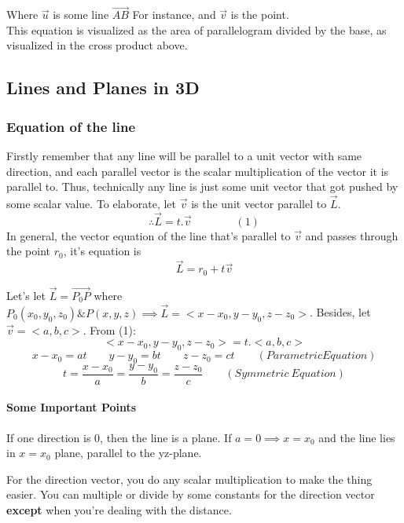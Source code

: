\documentclass{article}
\begin{document}
	Where $\vec{ u }$ is some line $ \vec{ AB } $ For instance, and $\vec{ v }$ is the point. \\ 
	This equation is visualized as the area of parallelogram divided by the base, as visualized in the cross product above.
	\\
	\newpage
	\subsection{Lines and Planes in 3D}

	\subsubsection{Equation of the line}

	Firstly remember that any line will be parallel to a unit vector with same direction, and each parallel vector is the scalar multiplication of the vector it is parallel to. Thus, technically any line is just some unit vector that got pushed by some scalar value. To elaborate, let $ \vec{ v } $ is the unit vector parallel to $ \vec{ L } $.
	\[
		\therefore \vec{ L } = t . \vec{ v }	\qquad \qquad (1)
	\]
	In general, the vector equation of the line that's parallel to $ \vec{ v } $ and passes through the point $r_0$, it's equation is
	\[
		\vec{ L } = r_0 + t \vec{ v }
	\]

	Let's let $\vec{ L } = \vec{ P_0P}$ where $ P_0(x_0,y_0,z_0) \& P(x,y,z) \implies \vec{L} = <x-x_0,y-y_0,z-z_0>$. Besides, let $ \vec{ v } = <a,b,c>$. From (1):
	\begin{equation*}
		<x-x_0,y-y_0,z-z_0> = t. <a,b,c>  
	\end{equation*}
	\begin{equation*}
		x-x_0=at \qquad y-y_0=bt \qquad z-z_0=ct \qquad (Parametric Equation)
	\end{equation*}
	\[
		t= \frac{ x-x_0 }{a} = \frac{ y-y_0 }{b} = \frac{ z-z_0 }{c }   \qquad (Symmetric\ Equation)
	\]

	\paragraph{Some Important Points}
	If one direction is 0, then the line is a plane. If $a=0 \implies x=x_0 $ and the line lies in $x=x_0$ plane, parallel to the yz-plane. 

	For the direction vector, you do any scalar multiplication to make the thing easier. You can multiple or divide by some constants for the direction vector \textbf{except} when you're dealing with the distance.
\end{document}
